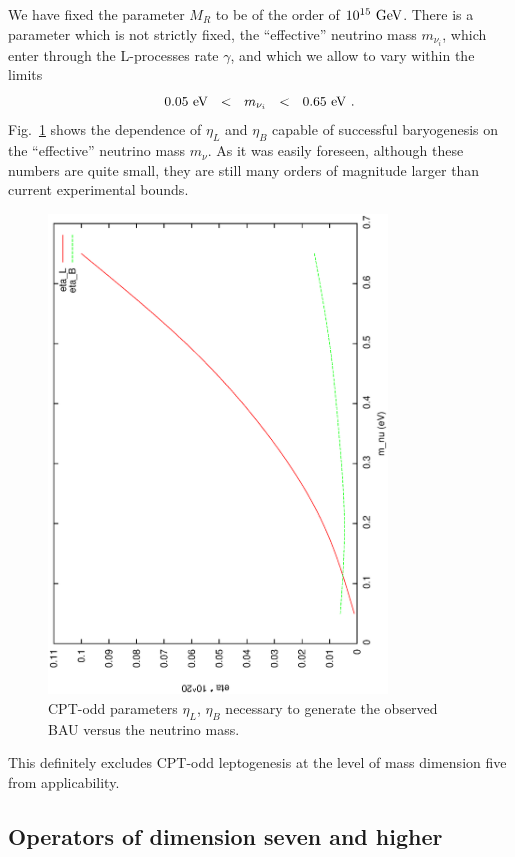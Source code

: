 \documentclass[12pt]{revtex4}
\newcommand{\GeV}{{\rm GeV}}
\newcommand{\eV}{{\rm eV}}
\begin{document}
	We have fixed the parameter $ M_R $ to be of the order of 
	$ 10^{15}~\GeV $.
	There is a parameter which is not strictly fixed,
	the ``effective'' neutrino mass $ m_{\nu_i} $, which enter 
	through the
	L-processes rate $ \gamma $,
	and which we allow to vary within the limits 
\[
	0.05~\eV ~~<~~ m_{\nu_i} ~~<~~0.65~\eV~.
\]
	Fig.~\ref{scan_fig} shows the dependence of $ \eta_L $ and 
	$ \eta_B $ capable
	of successful baryogenesis on the ``effective'' neutrino mass
	$ m_\nu $.
	As it was easily foreseen, although these numbers are quite
	small, they are still many orders of magnitude larger than
	current experimental bounds.
\begin{figure}
\includegraphics[width=9cm,angle=270]{scan.ps}
\caption{CPT-odd parameters $ \eta_L $, $ \eta_B $ necessary to generate
	the observed BAU versus the neutrino mass.}
\label{scan_fig}
\end{figure}
	This definitely excludes CPT-odd leptogenesis at the level of
	mass dimension five from applicability.

\subsection{Operators of dimension seven and higher}
\end{document}
